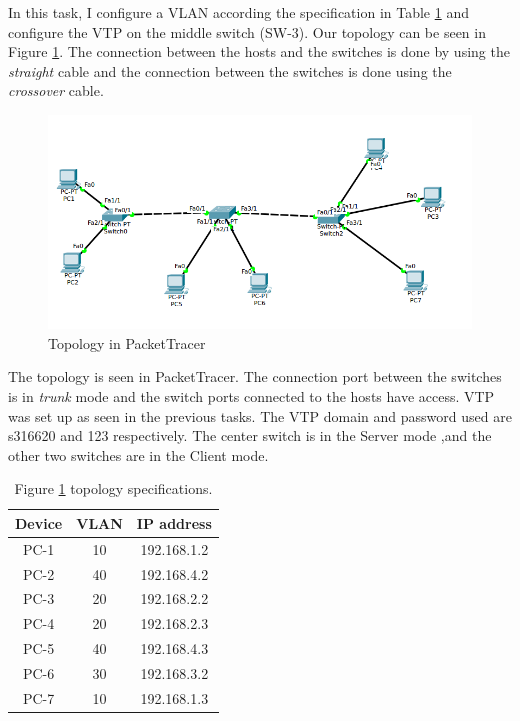 \documentclass{article}
\begin{document}
In this task, I configure a VLAN according the specification in Table \ref{tab:topospecs} and configure the VTP on the middle switch (SW-3). Our topology can be seen in Figure \ref{fig:acttopo}. The connection between the hosts and the switches is done by using the \textit{straight} cable and the connection between the switches is done using the \textit{crossover} cable. 

\begin{figure}[!h]
    \centering
    \includegraphics[scale=0.6,width=\textwidth]{acttopo}
    \caption{Topology in PacketTracer}
    \label{fig:acttopo}
\end{figure}

The topology is seen in PacketTracer. The connection port between the switches is in \textit{trunk} mode and the switch ports connected to the hosts have access. VTP was set up as seen in the previous tasks. The VTP domain and password used are s316620 and 123 respectively.  The center switch is in the Server mode ,and the other two switches are in the Client mode. 


\begin{table}[h]
    \centering
    \begin{tabular}{c|c|c}
    \hline
         Device &  VLAN & IP address\\
        \hline
         PC-1 & 10 & 192.168.1.2 \\
         PC-2 & 40 & 192.168.4.2 \\
         PC-3 & 20 & 192.168.2.2 \\
         PC-4 & 20 & 192.168.2.3 \\
         PC-5 & 40 & 192.168.4.3 \\
         PC-6 & 30 & 192.168.3.2\\
         PC-7 & 10 & 192.168.1.3 \\
         \hline
    \end{tabular}
    \caption{Figure \ref{fig:acttopo} topology specifications.}
    \label{tab:topospecs}
\end{table}
\end{document}
